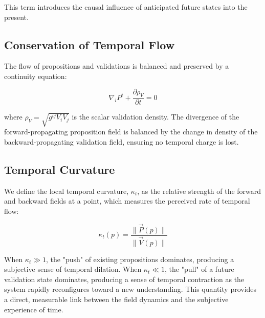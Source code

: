 This term introduces the causal influence of anticipated future states into the present.


\subsection{Conservation of Temporal Flow}
\label{sec:conservation_of_temporal_flow}

The flow of propositions and validations is balanced and preserved by a continuity equation:

\begin{equation}
\nabla_i P^i + \frac{\partial \rho_V}{\partial t} = 0
\end{equation}

where \(\rho_V = \sqrt{g^{ij} V_{i} V_{j}}\) is the scalar validation density. The divergence of the forward-propagating proposition field is balanced by the change in density of the backward-propagating validation field, ensuring no temporal charge is lost.


\subsection{Temporal Curvature}
\label{sec:temporal_curvature}

We define the local temporal curvature, \(\kappa_t\), as the relative strength of the forward and backward fields at a point, which measures the perceived rate of temporal flow:

\begin{equation}
\kappa_t(p) = \frac{\|\vec{P}(p)\|}{\|\vec{V}(p)\|}
\end{equation}

When \(\kappa_t \gg 1\), the "push" of existing propositions dominates, producing a subjective sense of temporal dilation. When \(\kappa_t \ll 1\), the "pull" of a future validation state dominates, producing a sense of temporal contraction as the system rapidly reconfigures toward a new understanding. This quantity provides a direct, measurable link between the field dynamics and the subjective experience of time. 